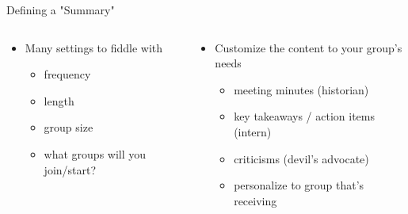 \documentclass[aspectratio=169]{beamer}
\begin{document}
\begin{frame}{Defining a "Summary"}
\begin{columns}[T]
    \begin{column}[T]{0.5\textwidth}
        \vspace{-1in}
        \begin{itemize}
            \item Many settings to fiddle with
            \begin{itemize}
                \item frequency
                \item length
                \item group size
                \item what groups will you join/start?
            \end{itemize}
        \end{itemize}
    \end{column}
    \begin{column}[T]{0.5\textwidth}
        \vspace{-1in}
        \begin{itemize}
            \item Customize the content to your group's needs
            \begin{itemize}
                \item meeting minutes (historian)
                \item key takeaways / action items (intern)
                \item criticisms (devil's advocate)
                \item personalize to group that's receiving
            \end{itemize}
        \end{itemize}
    \end{column}
\end{columns}
\end{frame}
\end{document}
